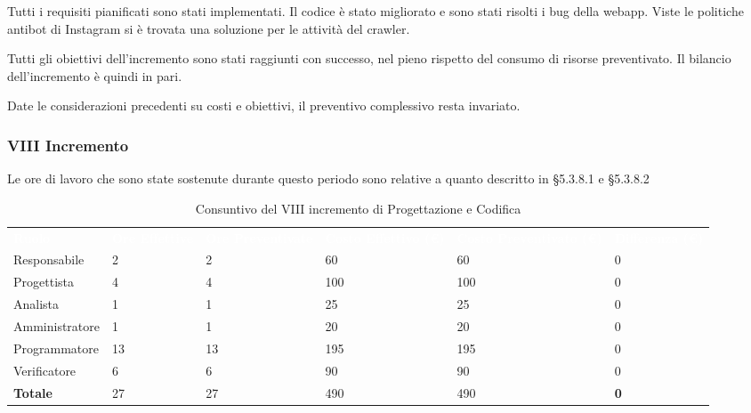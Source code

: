 Tutti i requisiti pianificati sono stati implementati. Il codice è stato migliorato e sono stati risolti i bug della webapp. Viste le politiche antibot di Instagram si è trovata una soluzione per le attività del crawler.

Tutti gli obiettivi dell’incremento sono stati raggiunti con successo, nel pieno rispetto del consumo di risorse preventivato. Il bilancio dell’incremento è quindi in pari.

Date le considerazioni precedenti su costi e obiettivi, il preventivo complessivo resta invariato.


\pagebreak


\subsubsection{VIII Incremento}
Le ore di lavoro che sono state sostenute durante questo periodo sono relative a quanto descritto in §5.3.8.1 e §5.3.8.2

\begin{table}[H]
\begin{center}
\renewcommand{\arraystretch}{1.5}
\begin{tabular}{ m{}<{\centering}  m{}<{\centering} m{}<{\centering} m{}<{\centering} m{}<{\centering} m{}<{\centering}}
	\rowcolor{darkblue}
	\textcolor{white}{\textbf{Ruolo}} & \textcolor{white}{\textbf{Ore Effettive}} & \textcolor{white}{\textbf{Ore Preventivate}}&\textcolor{white}{\textbf{Costo Effettivo (\euro)}}&\textcolor{white}{\textbf{Costo Preventivato (\euro)}}&\textcolor{white}{\textbf{Differenza (\euro)}}\\ 

	Responsabile  & 2 & 2 & 60 & 60 & 0\\	
	
	Progettista & 4 & 4 & 100 & 100 & 0\\
	
	Analista & 1 & 1 & 25 & 25 & 0\\
	
	Amministratore & 1 & 1 & 20 & 20 & 0\\
	
	Programmatore & 13 & 13 & 195 & 195 & 0\\
	
	Verificatore & 6 & 6 & 90 & 90 & 0\\
	
	\textbf{Totale} & 27 & 27 & 490 & 490 & \textbf{0} \\
	
\end{tabular}
\caption{Consuntivo del VIII incremento di Progettazione e Codifica}
\end{center}
\end{table}

